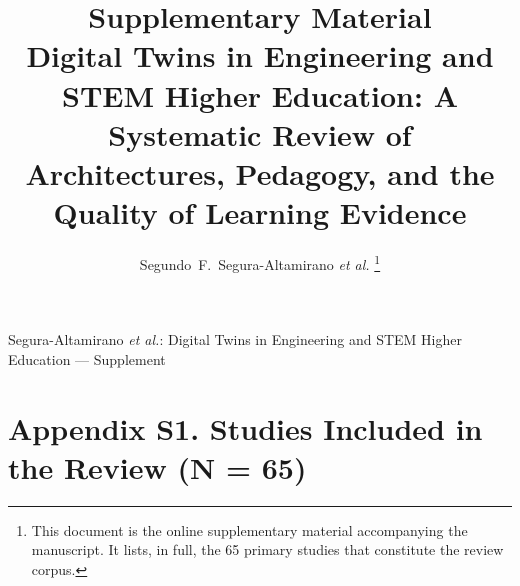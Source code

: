 \documentclass[journal]{IEEEtran}
\begin{document}
\title{Supplementary Material\\ Digital Twins in Engineering and STEM Higher Education: A Systematic Review of Architectures, Pedagogy, and the Quality of Learning Evidence}

\author{Segundo~F.~Segura-Altamirano \textit{et al.}%
\thanks{This document is the online supplementary material accompanying the manuscript. It lists, in full, the 65 primary studies that constitute the review corpus.}}

%
{Segura-Altamirano \MakeLowercase{\textit{et al.}}: Digital Twins in Engineering and STEM Higher Education --- Supplement}

\maketitle

\section*{Appendix S1. Studies Included in the Review (N = 65)}


\end{document}
